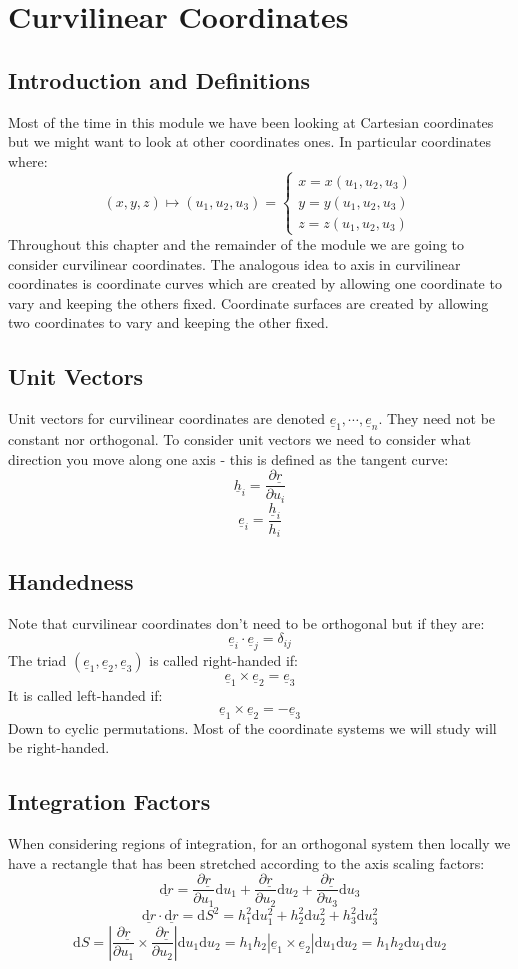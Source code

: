 \documentclass[12pt]{article}
\newcommand{\pf}[2]{\frac{\partial #1}{\partial #2}}
\begin{document}
\section{Curvilinear Coordinates}
\subsection{Introduction and Definitions}
Most of the time in this module we have been looking at Cartesian coordinates but we might want to look at other coordinates ones. In particular coordinates where:
\[(x,y,z)\mapsto (u_1,u_2,u_3)=\begin{cases}
    x=x(u_1,u_2,u_3) \\
    y=y(u_1,u_2,u_3) \\
    z=z(u_1,u_2,u_3)
\end{cases}\]
Throughout this chapter and the remainder of the module we are going to consider curvilinear coordinates. The analogous idea to axis in curvilinear coordinates is coordinate curves which are created by allowing one coordinate to vary and keeping the others fixed. Coordinate surfaces are created by allowing two coordinates to vary and keeping the other fixed.
\subsection{Unit Vectors}
Unit vectors for curvilinear coordinates are denoted \(\underline{e}_1,\cdots,\underline{e}_n\). They need not be constant nor orthogonal. To consider unit vectors we need to consider what direction you move along one axis - this is defined as the tangent curve:
\[\underline{h}_i=\pf{\underline{r}}{u_i}\]
\[\underline{e}_i=\frac{\underline{h}_i}{h_i}\]
\subsection{Handedness}
Note that curvilinear coordinates don't need to be orthogonal but if they are:
\[\underline{e}_i\cdot\underline{e}_j=\delta_{ij}\]
The triad \((\underline{e}_1,\underline{e}_2,\underline{e}_3)\) is called right-handed if:
\[\underline{e}_1\times\underline{e}_2=\underline{e}_3\]
It is called left-handed if:
\[\underline{e}_1\times \underline{e}_2=-\underline{e}_3\]
Down to cyclic permutations. Most of the coordinate systems we will study will be right-handed.
\subsection{Integration Factors}
When considering regions of integration, for an orthogonal system then locally we have a rectangle that has been stretched according to the axis scaling factors:
\[\underline{\text{d}r}=\pf{\underline{r}}{u_1}\text{d}u_1+\pf{\underline{r}}{u_2}\text{d}u_2+\pf{\underline{r}}{u_3}\text{d}u_3\]
\[\underline{\text{d}r}\cdot\underline{\text{d}r}=\text{d}S^2=h_1^2\text{d}u_1^2+h_2^2\text{d}u_2^2+h_3^2\text{d}u_3^2\]
\[\text{d}S=\left|\pf{\underline{r}}{u_1}\times \pf{\underline{r}}{u_2}\right|\text{d}u_1\text{d}u_2=h_1h_2|\underline{e}_1\times \underline{e}_2|\text{d}u_1\text{d}u_2=h_1h_2\text{d}u_1\text{d}u_2\]
\end{document}
